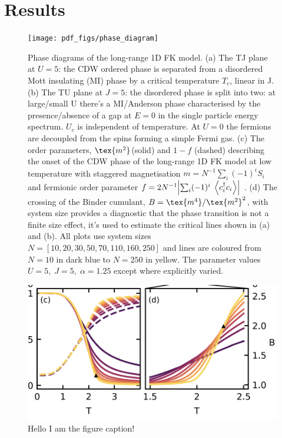 \hypertarget{fk-results}{%
\section{Results}\label{fk-results}}

\begin{figure}
\hypertarget{fig:phase_diagram}{%
\centering
\texttt{[image: pdf\_figs/phase\_diagram]}
\caption{Phase diagrams of the long-range 1D FK model. (a) The TJ plane at \(U = 5\): the {CDW} ordered phase is separated from a disordered Mott insulating (MI) phase by a critical temperature \(T_c\), linear in J. (b) The TU plane at \(J = 5\): the disordered phase is split into two: at large/small U there's a MI/Anderson phase characterised by the presence/absence of a gap at \(E=0\) in the single particle energy spectrum. \(U_c\) is independent of temperature. At \(U = 0\) the fermions are decoupled from the spins forming a simple Fermi gas. (c) The order parameters, \(\tex{m^2}\)(solid) and \(1 - f\) (dashed) describing the onset of the {CDW} phase of the long-range 1D {FK} model at low temperature with staggered magnetisation \(m = N^{-1} \sum_i (-1)^i S_i\) and fermionic order parameter \(f = 2 N^{-1}\abs{\sum_i (-1)^i \; \expval{c^\dag_{i}c_{i}}}\) . (d) The crossing of the Binder cumulant, \(B = \tex{m^4} / \tex{m^2}^2\), with system size provides a diagnostic that the phase transition is not a finite size effect, it's used to estimate the critical lines shown in (a) and (b). All plots use system sizes \(N = [10,20,30,50,70,110,160,250]\) and lines are coloured from \(N = 10\) in dark blue to \(N = 250\) in yellow. The parameter values \(U = 5,\;J = 5,\;\alpha = 1.25\) except where explicitly varied.}\label{fig:phase_diagram}
}
\end{figure}

\hypertarget{fig:binder}{%
\begin{figure}
\centering
\includegraphics[width=1\textwidth,height=\textheight]{figure_code/fk_chapter/binder.png}
\caption[{no title}]{Hello I am the figure caption!}
\label{fig:binder}
\end{figure}
}

